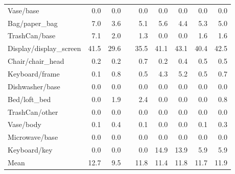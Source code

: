 \begin{table}[!h]
\begin{tabular}{lrrrrrrrr}
Vase/base                &              0.0 &                  0.0 &&     0.0 &             0.0 &                     0.0 &           0.0 &                   0.0 \\
Bag/paper\_bag            &              7.0 &                  3.6 &&     5.1 &             5.6 &                     4.4 &           5.3 &                   5.0 \\
TrashCan/base            &              7.1 &                  2.0 &&     1.3 &             0.0 &                     0.0 &           1.6 &                   1.6 \\
Display/display\_screen   &             41.5 &                 29.6 &&    35.5 &            41.1 &                    43.1 &          40.4 &                  42.5 \\
Chair/chair\_head         &              0.2 &                  0.2 &&     0.7 &             0.2 &                     0.4 &           0.5 &                   0.5 \\
Keyboard/frame           &              0.1 &                  0.8 &&     0.5 &             4.3 &                     5.2 &           0.5 &                   0.7 \\
Dishwasher/base          &              0.0 &                  0.0 &&     0.0 &             0.0 &                     0.0 &           0.0 &                   0.0 \\
Bed/loft\_bed             &              0.0 &                  1.9 &&     2.4 &             0.0 &                     0.0 &           0.0 &                   0.8 \\
TrashCan/other           &              0.0 &                  0.0 &&     0.0 &             0.0 &                     0.0 &           0.0 &                   0.0 \\
Vase/body                &              0.1 &                  0.4 &&     0.1 &             0.0 &                     0.0 &           0.1 &                   0.3 \\
Microwave/base           &              0.0 &                  0.0 &&     0.0 &             0.0 &                     0.0 &           0.0 &                   0.0 \\
Keyboard/key             &              0.0 &                  0.0 &&     0.0 &            14.9 &                    13.9 &           5.9 &                   5.9 \\
\midrule
Mean                     &             12.7 &                  9.5 &&    11.8 &            11.4 &                    11.8 &          11.7 &                  11.9 \\
\bottomrule
\end{tabular}
\end{table}

